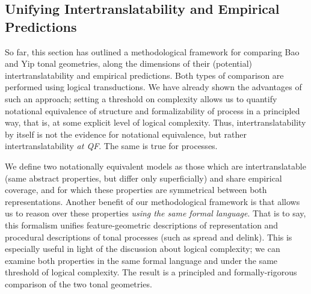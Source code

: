 \documentclass{article}
\begin{document}
\subsection{Unifying Intertranslatability and Empirical Predictions}
So far, this section has outlined a methodological framework for comparing Bao and Yip tonal geometries, along the dimensions of their (potential) intertranslatability and empirical predictions. Both types of comparison are performed using logical transductions. We have already shown the advantages of such an approach; setting a threshold on complexity allows us to quantify notational equivalence of structure and formalizability of process in a principled way, that is, at some explicit level of logical complexity. Thus, intertranslatability by itself is not the evidence for notational equivalence, but rather intertranslatability \emph{at QF}. The same is true for processes. \par
We define two notationally equivalent models as those which are intertranslatable (same abstract properties, but differ only superficially) and share empirical coverage, and for which these properties are symmetrical between both representations. Another benefit of our methodological framework is that allows us to reason over these properties \emph{using the same formal language}. That is to say, this formalism unifies feature-geometric descriptions of representation and procedural descriptions of tonal processes (such as spread and delink). This is especially useful in light of the discussion about logical complexity; we can examine both properties in the same formal language and under the same threshold of logical complexity. The result is a principled and formally-rigorous comparison of the two tonal geometries.
\end{document}
